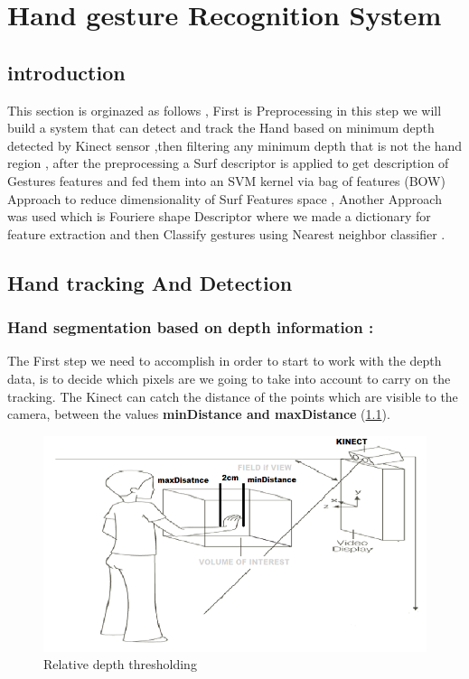 
\chapter{Hand gesture Recognition System} \label{hgr}

\section{introduction}

This section is orginazed as follows , First is Preprocessing in this step we will build a system that can detect and track the Hand based on minimum depth detected by Kinect sensor ,then filtering any minimum depth that is not the hand region , after the preprocessing  a Surf descriptor is applied to get description of Gestures features  and fed them into an SVM kernel via bag of features (BOW) Approach to reduce dimensionality of Surf Features space , Another Approach was used which is Fouriere shape Descriptor where we made a dictionary for feature extraction and then Classify gestures using Nearest neighbor classifier .



\section{Hand tracking  And Detection}

\subsection{Hand segmentation based on depth information :} \label{depth}

The First step we need to accomplish in order to start to work with the depth data, is to decide which pixels are we going to take into account to carry on the tracking. The Kinect can catch the distance of the points which are visible to the camera, between the values \textbf{minDistance and maxDistance} (\ref{fig:cam8}).

\begin{figure}[H]
\centering
\includegraphics[width=1.0\textwidth]{img/mindistance.png}
\caption{Relative depth thresholding }
\label{fig:cam8}
\end{figure}

